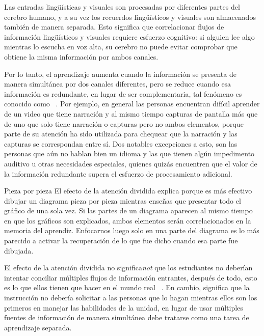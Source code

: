 Las entradas lingüísticas y visuales son procesadas por diferentes partes del cerebro humano, y a su vez los recuerdos lingüísticos y visuales son almacenados también de manera separada. Esto significa que correlacionar flujos de información lingüísticos y visuales requiere esfuerzo cognitivo: si alguien lee algo mientras lo escucha en voz alta, su cerebro no puede evitar comprobar que obtiene la misma información por ambos canales.

Por lo tanto, el aprendizaje aumenta cuando la información se presenta de manera simultánea por dos canales diferentes, pero se reduce cuando esa información es redundante, en lugar de ser complementaria, tal fenómeno es conocido como ~\cite{Maye2003}.
Por ejemplo, en general las personas encuentran difícil aprender de un video que tiene narración y al mismo tiempo capturas de pantalla más que de uno que solo tiene narración o capturas pero no ambos elementos, porque parte de su atención ha sido utilizada para chequear que la narración  y las capturas se correspondan entre sí. Dos notables excepciones a esto, son las personas que aún no hablan bien un idioma y las que tienen algún impedimento auditivo u otras necesidades especiales, quienes quizás encuentren que el valor de la información redundante supera el esfuerzo de procesamiento adicional.

\begin{aside}{Pieza por pieza}
El efecto de la atención dividida explica porque es más efectivo dibujar un diagrama pieza por pieza mientras enseñas que presentar todo el gráfico de una sola vez. Si las partes de un diagrama aparecen al mismo tiempo en que los gráficos son explicados, ambos elementos serán correlacionados en la memoria del aprendiz. Enfocarnos luego solo en una parte del diagrama es lo más parecido a activar la recuperación de lo que fue dicho cuando esa parte fue dibujada. 
\end{aside}

El efecto de la atención dividida no significa\emph{not} 
que los estudiantes no deberían intentar conciliar múltiples flujos de información entrantes, después de todo, esto es lo que ellos tienen que hacer en el mundo real  ~\cite{Atki2000}.
En cambio, significa que la instrucción no debería solicitar a las personas que lo hagan mientras ellos son los primeros en manejar las habilidades de la unidad, en lugar de usar múltiples fuentes  de información de manera simultánea debe tratarse como una tarea de aprendizaje separada. 

